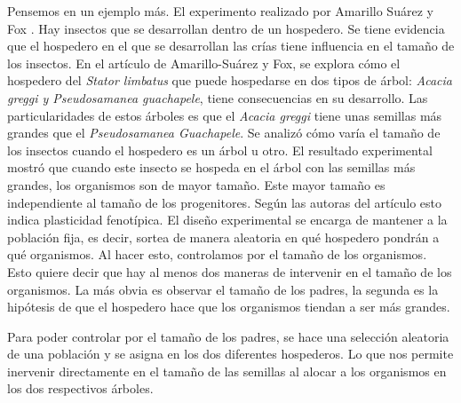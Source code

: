 Pensemos en un ejemplo más. El experimento realizado por Amarillo Suárez y Fox \citeyear{Amarillo-Suarez2006}. Hay insectos que se desarrollan dentro de un hospedero. Se tiene evidencia que el hospedero en el que se desarrollan las crías tiene influencia en el tamaño de los insectos. En el artículo de Amarillo-Suárez y Fox, se explora cómo el hospedero del \emph{Stator limbatus} que puede hospedarse en dos tipos de árbol: \emph{Acacia greggi y Pseudosamanea guachapele}, tiene consecuencias en su desarrollo. Las particularidades de estos árboles es que el \emph{Acacia greggi} tiene unas semillas más grandes que el \emph{Pseudosamanea Guachapele}. Se analizó cómo varía el tamaño de los insectos cuando el hospedero es un árbol u otro. El resultado experimental mostró que cuando este insecto se hospeda en el árbol con las semillas más grandes, los organismos son de mayor tamaño. Este mayor tamaño es independiente al tamaño de los progenitores. Según las autoras del artículo esto indica plasticidad fenotípica. El diseño experimental se encarga de mantener a la población fija, es decir, sortea de manera aleatoria en qué hospedero pondrán a qué organismos. Al hacer esto, controlamos por el tamaño de los organismos. Esto quiere decir que hay al menos dos maneras de intervenir en el tamaño de los organismos. La más obvia es observar el tamaño de los padres, la segunda es la hipótesis de que el hospedero hace que los organismos tiendan a ser más grandes.

\begin{center}
\end{center}


Para poder controlar por el tamaño de los padres, se hace una selección aleatoria de una población y se asigna en los dos diferentes hospederos. Lo que nos permite inervenir directamente en el tamaño de las semillas al alocar a los organismos en los dos respectivos árboles.

\begin{center}
\end{center}

